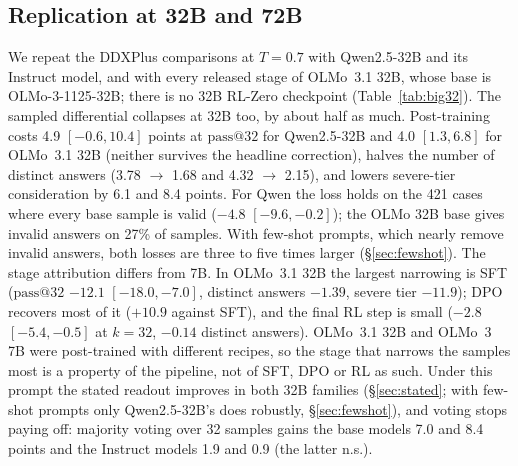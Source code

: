 \documentclass[wcp]{jmlr}
\makeatletter
\newcommand{\passk}[1]{\mathrm{pass@}#1}
\makeatother
\begin{document}
\subsection{Replication at 32B and 72B}\label{sec:big32}
We repeat the DDXPlus comparisons at $T{=}0.7$ with Qwen2.5-32B and its Instruct model, and with every released stage of OLMo~3.1 32B, whose base is OLMo-3-1125-32B; there is no 32B RL-Zero checkpoint (Table~\ref{tab:big32}).
The sampled differential collapses at 32B too, by about half as much. Post-training costs 4.9 $[-0.6,10.4]$ points at $\passk{32}$ for Qwen2.5-32B and 4.0 $[1.3,6.8]$ for OLMo~3.1 32B (neither survives the headline correction), halves the number of distinct answers (3.78 $\rightarrow$ 1.68 and 4.32 $\rightarrow$ 2.15), and lowers severe-tier consideration by 6.1 and 8.4 points. For Qwen the loss holds on the 421 cases where every base sample is valid ($-4.8$ $[-9.6,-0.2]$); the OLMo 32B base gives invalid answers on 27\% of samples. With few-shot prompts, which nearly remove invalid answers, both losses are three to five times larger (\S\ref{sec:fewshot}).
The stage attribution differs from 7B. In OLMo~3.1 32B the largest narrowing is SFT ($\passk{32}$ $-12.1$ $[-18.0,-7.0]$, distinct answers $-1.39$, severe tier $-11.9$); DPO recovers most of it ($+10.9$ against SFT), and the final RL step is small ($-2.8$ $[-5.4,-0.5]$ at $k{=}32$, $-0.14$ distinct answers). OLMo~3.1 32B and OLMo~3 7B were post-trained with different recipes, so the stage that narrows the samples most is a property of the pipeline, not of SFT, DPO or RL as such.
Under this prompt the stated readout improves in both 32B families (\S\ref{sec:stated}; with few-shot prompts only Qwen2.5-32B's does robustly, \S\ref{sec:fewshot}), and voting stops paying off: majority voting over 32 samples gains the base models 7.0 and 8.4 points and the Instruct models 1.9 and 0.9 (the latter n.s.).
\end{document}
